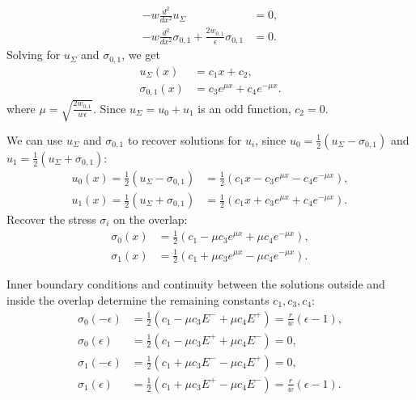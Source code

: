 \documentclass[reqno]{amsart}
\numberwithin{equation}{section}
\theoremstyle{definition}
\begin{document}
\begin{subequations}
\begin{align}
-w \frac{d^2}{dx^2}u_\Sigma &= 0, \\
-w \frac{d^2}{dx^2}\sigma_{0,1}+ \frac{2w_{0,1}}{\epsilon}\sigma_{0,1} &= 0.
\end{align}
\end{subequations}
Solving for $u_\Sigma$ and $\sigma_{0,1}$, we get
\begin{subequations}
\begin{align}
u_\Sigma(x) &= c_1 x + c_2, \\
\sigma_{0,1}(x)&= c_3 e^{\mu x} + c_4e^{-\mu x}.
\end{align}
\end{subequations}
where $\mu = \sqrt{\frac{2w_{0,1}}{w\epsilon}}$.  Since $u_\Sigma = u_0 +u_1$ is an odd function, $c_2 = 0$.

We can use $u_\Sigma$ and $\sigma_{0,1}$ to recover solutions for $u_i$, since $u_0 = \frac12 (u_\Sigma - \sigma_{0,1})$ and $u_1 = \frac12 (u_\Sigma + \sigma_{0,1})$:
\begin{subequations}
\begin{align}
u_0(x)=\frac12(u_\Sigma-\sigma_{0,1}) &= \frac12\left(c_1 x   - c_3 e^{\mu x} - c_4 e^{-\mu x} \right), \\   
u_1(x)=\frac12(u_\Sigma+\sigma_{0,1}) &= \frac12 \left(c_1 x + c_3 e^{\mu x} + c_4 e^{-\mu x}\right). 
\end{align}    
\end{subequations}
Recover the stress $\sigma_i$ on the overlap:
\begin{subequations}
\begin{align}
\sigma_0(x) &= \frac12\left(c_1 - \mu c_3  e^{\mu x} + \mu c_4e^{-\mu x} \right), \\  
\sigma_1(x) &= \frac12 \left(c_1 + \mu c_3 e^{\mu x} -\mu c_4e^{-\mu x}\right). 
\end{align}    
\end{subequations}

Inner boundary conditions and continuity between the solutions outside and inside the overlap determine the remaining constants $c_1, c_3, c_4$:
\begin{subequations}
\begin{align}
\sigma_0(-\epsilon) &=  \frac12\left(c_1 - \mu c_3  E^- + \mu c_4E^+ \right) = \frac{r}{w}(\epsilon - 1), \label{eq: ct a} \\
\sigma_0(\epsilon) &= \frac12\left(c_1 - \mu c_3 E^+ + \mu c_4 E^- \right) = 0, \label{eq: ct b} \\
\sigma_1(-\epsilon) &= \frac12 \left(c_1 + \mu c_3 E^- -\mu c_4 E^+\right) =0, \label{eq: ct c} \\
\sigma_1(\epsilon) &=  \frac12 \left(c_1 + \mu c_3 E^+ -\mu c_4 E^-\right) = \frac{r}{w}(\epsilon - 1). \label{eq: ct d}
\end{align}    
\end{subequations}
\end{document}
